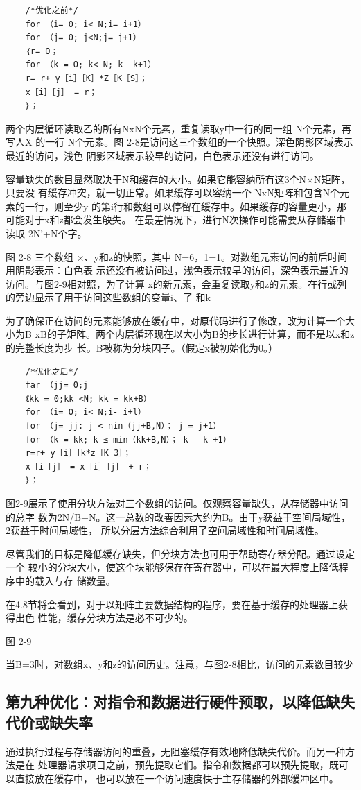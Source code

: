 \begin{verbatim}
    /*优化之前*/
    for （i= 0; i< N;i= i+1）
    for （j= 0; j<N;j= j+1）
    ｛r= O；
    for （k = O; k< N; k- k+1）
    r= r+ y［i］［K］*Z［K［S］；
    x［i］［j］ = r；
    ｝；
\end{verbatim}
两个内层循环读取乙的所有NxN个元素，重复读取y中一行的同一组 N个元素，再写人X
的一行 N个元素。图 2-8是访问这三个数组的一个快照。深色阴影区域表示最近的访问，浅色
阴影区域表示较早的访问，白色表示还没有进行访问。

容量缺失的数目显然取决于N和缓存的大小。如果它能容纳所有这3个N×N矩阵，只要没
有缓存冲突，就一切正常。如果缓存可以容纳一个 NxN矩阵和包含N个元素的一行，则至少y
的第i行和数组可以停留在缓存中。如果缓存的容量更小，那可能对于x和z都会发生觖失。
在最差情况下，进行N次操作可能需要从存储器中读取 2N’+N个字。

图 2-8
三个数组 ×、y和z的快照，其中 N=6，1=1。对数组元素访问的前后时间用阴影表示：白色表
示还没有被访问过，浅色表示较早的访问，深色表示最近的访问。与图2-9相对照，为了计算
x的新元素，会重复读取y和z的元素。在行或列的旁边显示了用于访问这些数组的变量i、了
和k


为了确保正在访问的元素能够放在缓存中，对原代码进行了修改，改为计算一个大小为B
xB的子矩阵。两个内层循环现在以大小为B的步长进行计算，而不是以x和z的完整长度为步
长。B被称为分块因子。（假定x被初始化为0。）
\begin{verbatim}
    /*优化之后*/
    far （jj= 0;j
    《kk = 0;kk <N; kk = kk+B）
    for （i= O; i< N;i- i+l）
    for （j= jj: j < nin（jj+B,N）； j = j+1）
    for （k = kk; k ≤ min（kk+B,N）； k - k +1）
    r=r+ y［i］［k*z［K 3］；
    x［i［j］ = x［i］［j］ + r；
    ｝；
\end{verbatim}
图2-9展示了使用分块方法对三个数组的访问。仅观察容量缺失，从存储器中访问的总字
数为2N/B+N。这一总数的改善因素大约为B。由于y获益于空间局域性，2获益于时间局域性，
所以分层方法综合利用了空间局域性和时间局域性。

尽管我们的目标是降低缓存缺失，但分块方法也可用于帮助寄存器分配。通过设定一个
较小的分块大小，使这个块能够保存在寄存器中，可以在最大程度上降低程序中的载入与存
储数量。

在4.8节将会看到，对于以矩阵主要数据结构的程序，要在基于缓存的处理器上获得出色
性能，缓存分块方法是必不可少的。

图 2-9

当B=3时，对数组x、y和z的访问历史。注意，与图2-8相比，访问的元素数目较少

\subsection{第九种优化：对指令和数据进行硬件预取，以降低缺失代价或缺失率}
通过执行过程与存储器访问的重叠，无阻塞缓存有效地降低缺失代价。而另一种方法是在
处理器请求项目之前，预先提取它们。指令和数据都可以预先提取，既可以直接放在缓存中，
也可以放在一个访问速度快于主存储器的外部缓冲区中。

